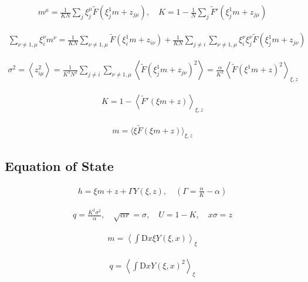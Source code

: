 \documentclass{article}
\begin{document}
\begin{align*}
m^\mu = \frac{1}{K N} \sum_j \xi_j^\mu \tilde{F}\left( \xi_j^1 m + z_{j \mu} \right), \quad K = 1 - \frac{1}{N} \sum_j \tilde{F}'\left( \xi_j^1 m + z_{j \mu} \right)\tag{7.46}
\end{align*}

\begin{align*}
\sum_{\nu \neq 1, \mu} \xi_i^\nu m^\nu = \frac{1}{K N} \sum_{\nu \neq 1, \mu} \tilde{F}\left( \xi_i^1 m + z_{i \nu} \right) + \frac{1}{K N} \sum_{j \neq i} \sum_{\nu \neq 1, \mu} \xi_i^\nu \xi_j^\nu \tilde{F}\left( \xi_j^1 m + z_{j \nu} \right)\tag{7.47}
\end{align*}

\begin{align*}
\sigma^{2}=\left\langle z_{i \mu}^{2}\right\rangle=\frac{1}{K^{2} N^{2}} \sum_{j \neq i} \sum_{\nu \neq 1, \mu}\left\langle\tilde{F}\left(\xi_{j}^{1} m+z_{j \nu}\right)^{2}\right\rangle=\frac{\alpha}{K^{2}}\left\langle\tilde{F}\left(\xi^{1} m+z\right)^{2}\right\rangle_{\xi, z}\tag{7.48}
\end{align*}

\begin{align*}
K = 1 - \left\langle \tilde{F}'(\xi m + z) \right\rangle_{\xi, z}\tag{7.49}
\end{align*}

\begin{align*}
m = \langle \xi \tilde{F}(\xi m + z) \rangle_{\xi, z}\tag{7.50}
\end{align*}

\subsection{Equation of State}

\begin{align*}
h = \xi m + z + \Gamma Y(\xi, z), \quad \left( \Gamma = \frac{\alpha}{K} - \alpha \right)\tag{7.51}
\end{align*}

\begin{align*}
q = \frac{K^2 \sigma^2}{\alpha}, \quad \sqrt{\alpha r} = \sigma, \quad U = 1 - K, \quad x \sigma = z\tag{7.52}
\end{align*}

\begin{align*}
m = \left\langle \int \mathrm{D}x \xi Y(\xi, x) \right\rangle_{\xi}\tag{7.53}
\end{align*}

\begin{align*}
q = \left\langle \int \mathrm{D}x Y(\xi, x)^2 \right\rangle_{\xi}\tag{7.54}
\end{align*}
\end{document}
